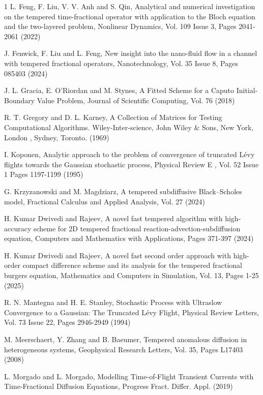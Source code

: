 \documentclass[10pt, reqno]{amsart}
\theoremstyle{remark}
\theoremstyle{definition}
\numberwithin{table}{section}
\begin{document}
\begin{thebibliography}{1}
L.  Feng,  F.  Liu,  V.  V.  Anh and S.  Qin,  Analytical and numerical investigation on the tempered time-fractional operator with application to the Bloch equation and the two-layered problem,  Nonlinear Dynamics,  Vol.  109 Issue 3,  Pages 2041-2061 (2022)

J.  Fenwick,  F.  Liu and L.  Feng,  New insight into the nano-fluid flow in a channel with tempered fractional operators,  Nanotechnology,  Vol.  35 Issue 8,  Pages 085403 (2024)

J.  L.  Gracia,  E.  O'Riordan and M.  Stynes,  A Fitted Scheme for a Caputo Initial-Boundary Value Problem,  Journal of Scientific Computing,  Vol.  76 (2018) 

R. T.  Gregory and D. L.  Karney,  A Collection of Matrices for Testing Computational Algorithms.  Wiley-Inter-science,  John Wiley \& Sons,  New York,  London ,  Sydney,  Toronto.  (1969)

I.  Koponen,  Analytic approach to the problem of convergence of truncated L\'evy flights towards the Gaussian stochastic process,  Physical Review E ,  Vol.  52 Issue 1 Pages 1197-1199 (1995)

G.  Krzyzanowski and M.  Magdziarz,  A tempered subdiffusive Black–Scholes model,  Fractional Calculus and Applied Analysis,  Vol.  27 (2024)

H.  Kumar Dwivedi and Rajeev,  A novel fast tempered algorithm with high-accuracy scheme for 2D tempered fractional reaction-advection-subdiffusion equation,  Computers and Mathematics with Applications,  Pages 371-397 (2024)

H.  Kumar Dwivedi and Rajeev,  A novel fast second order approach with high-order compact difference scheme and its analysis for the tempered fractional burgers equation,  Mathematics and Computers in Simulation,  Vol.  13,  Pages 1-25 (2025)

R.  N.  Mantegna and H.  E.  Stanley,  Stochastic Process with Ultraslow Convergence to a Gaussian: The Truncated L\'evy Flight,  Physical Review Letters,  Vol.  73 Issue 22,  Pages 2946-2949 (1994)

M.  Meerschaert,  Y.  Zhang and B.  Baeumer,  Tempered anomalous diffusion in heterogeneous systems,  Geophysical Research Letters,  Vol.  35,  Pages L17403 (2008)

L.  Morgado and L.  Morgado,  Modelling Time-of-Flight Transient Currents with Time-Fractional Diffusion Equations, Progress Fract.  Differ.  Appl.  (2019)


\end{thebibliography}
\end{document}
